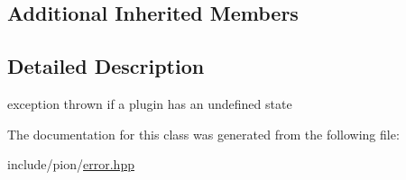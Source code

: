 \subsection*{Additional Inherited Members}


\subsection{Detailed Description}
exception thrown if a plugin has an undefined state 

The documentation for this class was generated from the following file\-:\begin{DoxyCompactItemize}
\item 
include/pion/\hyperlink{error_8hpp}{error.\-hpp}\end{DoxyCompactItemize}
